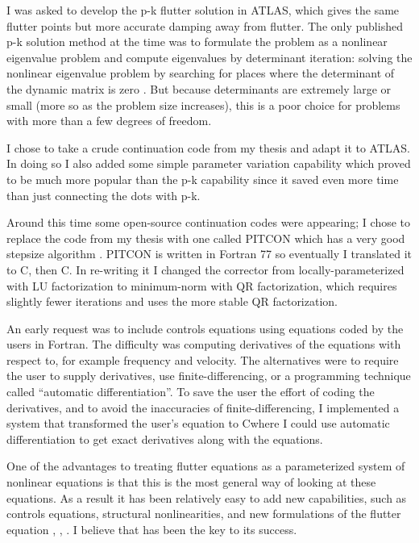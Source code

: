 \documentclass[11pt,openany,twoside]{book}
\numberwithin{equation}{section}		%
\def\Cpp{{C\nolinebreak[4]\hspace{-.05em}\raisebox{.4ex}{\tiny\bf ++}}\:}
\begin{document}
I was asked to develop the p-k flutter solution in ATLAS, which
gives the same flutter points but more accurate damping away from flutter.
The only published p-k solution method at the time was to formulate
the problem as a nonlinear eigenvalue problem and compute eigenvalues
by determinant iteration:
solving the nonlinear eigenvalue problem by searching for places where
the determinant of the dynamic matrix is zero \cite{hassig1971approximate}.
But because determinants are extremely large or small (more so as the
problem size increases), this is a poor choice for problems with more
than a few degrees of freedom.

I chose to take a crude continuation code from my thesis
\cite{meyer1982aeroelastic} and adapt
it to ATLAS. In doing so I also added some simple parameter variation capability
which proved to be much more popular than the p-k capability since
it saved even more time than just connecting the dots with p-k.

Around this time some open-source continuation codes were appearing;
I chose to replace the code from my thesis with one called PITCON
which has a very good stepsize algorithm \cite{rheinboldt1983algorithm}.
PITCON is written in Fortran 77 so eventually I translated it to C, then
\Cpp. In re-writing it I changed the corrector from locally-parameterized
with LU factorization to minimum-norm with QR factorization, which requires
slightly fewer iterations and uses the more stable QR factorization.

An early request was to include controls equations using equations
coded by the users in Fortran. The difficulty was computing derivatives
of the equations with respect to, for example frequency and velocity.
The alternatives were to require the user to supply derivatives, use
finite-differencing, or a programming technique called
``automatic differentiation''.
To save the user the effort of coding the derivatives, and to
avoid the inaccuracies of finite-differencing, I implemented a system
that transformed the user's equation to \Cpp where I could use automatic
differentiation to get exact derivatives along with the equations.

One of the advantages to treating flutter equations as a parameterized
system of nonlinear equations is that this is the most general way of
looking at these equations.
As a result it has been relatively easy to add new capabilities, such as
controls equations, structural nonlinearities, and new formulations of the flutter
equation
\cite{hassig1971approximate},
\cite{chen2000damping}, \cite{edwards2008flutter}.
I believe that has been the key to its success.
\end{document}
